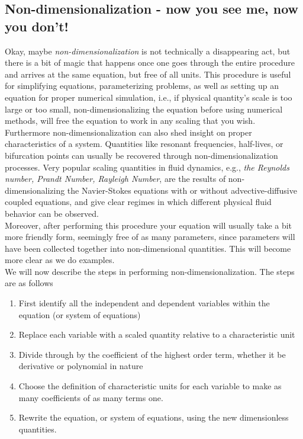 \subsection{Non-dimensionalization - now you see me, now you don't!}

Okay, maybe \emph{non-dimensionalization} is not technically a disappearing act, but there is a bit of magic that happens once one goes through the entire procedure and arrives at the same equation, but free of all units. This procedure is useful for simplifying equations, parameterizing problems, as well as setting up an equation for proper numerical simulation, i.e., if physical quantity's scale is too large or too small, non-dimensionalizing the equation before using numerical methods, will free the equation to work in any scaling that you wish. \\

Furthermore non-dimensionalization can also shed insight on proper characteristics of a system. Quantities like resonant frequencies, half-lives, or bifurcation points can usually be recovered through non-dimensionalization processes. Very popular scaling quantities in fluid dynamics, e.g., \emph{the Reynolds number, Prandt Number, Rayleigh Number}, are the results of non-dimensionalizing the Navier-Stokes equations with or without advective-diffusive coupled equations, and give clear regimes in which different physical fluid behavior can be observed. \\

Moreover, after performing this procedure your equation will usually take a bit more friendly form, seemingly free of as many parameters, since parameters will have been collected together into non-dimensional quantities. This will become more clear as we do examples. \\

We will now describe the steps in performing non-dimensionalization. The steps are as follows\\

\begin{enumerate}
\item First identify all the independent and dependent variables within the equation (or system of equations)
\item Replace each variable with a scaled quantity relative to a characteristic unit
\item Divide through by the coefficient of the highest order term, whether it be derivative or polynomial in nature
\item Choose the definition of characteristic units for each variable to make as many coefficients of as many terms one.
\item Rewrite the equation, or system of equations, using the new dimensionless quantities.
\end{enumerate}


